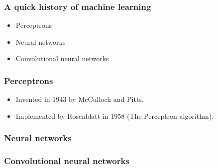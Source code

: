 \begin{frame}
  \frametitle{A quick history of machine learning}
  \begin{itemize}
  \item Perceptrons
  \item Neural networks
  \item Convolutional neural networks
  \end{itemize}
\end{frame}

\begin{frame}
  \frametitle{Perceptrons}
  {
    \small
    \begin{itemize}
    \item Invented in 1943 by McCulloch and Pitts.
    \item Implemented by Rosenblatt in 1958 (The Perceptron algorithm).
    \end{itemize}
  }
  \vspace{2.5in}
\end{frame}

\begin{frame}
  \frametitle{Neural networks}
\end{frame}

\begin{frame}
  \frametitle{Convolutional neural networks}
\end{frame}
